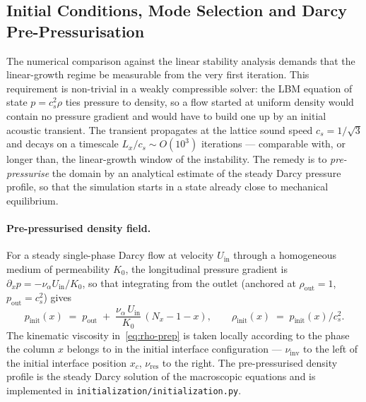 \subsection{Initial Conditions, Mode Selection and Darcy Pre-Pressurisation}
\label{sec:initial-conditions}

The numerical comparison against the linear stability analysis demands that the linear-growth regime be measurable from the very first iteration.
This requirement is non-trivial in a weakly compressible solver: the LBM equation of state $p = c_s^{2}\rho$ ties pressure to density, so a flow started at uniform density would contain no pressure gradient and would have to build one up by an initial acoustic transient.
The transient propagates at the lattice sound speed $c_s = 1/\sqrt{3}$ and decays on a timescale $L_x/c_s \sim O(10^{3})$ iterations --- comparable with, or longer than, the linear-growth window of the instability.
The remedy is to \emph{pre-pressurise} the domain by an analytical estimate of the steady Darcy pressure profile, so that the simulation starts in a state already close to mechanical equilibrium.

\paragraph{Pre-pressurised density field.}
For a steady single-phase Darcy flow at velocity $U_{\mathrm{in}}$ through a homogeneous medium of permeability $K_0$, the longitudinal pressure gradient is $\partial_x p = -\nu_\alpha U_{\mathrm{in}}/K_0$, so that integrating from the outlet (anchored at $\rho_{\mathrm{out}} = 1$, $p_{\mathrm{out}} = c_s^{2}$) gives
\begin{equation}
p_{\mathrm{init}}(x)
\;=\; p_{\mathrm{out}} \;+\; \frac{\nu_\alpha\,U_{\mathrm{in}}}{K_0}\,(N_x - 1 - x),
\qquad
\rho_{\mathrm{init}}(x) \;=\; p_{\mathrm{init}}(x)/c_s^{2}.
\label{eq:rho-prep}
\end{equation}
The kinematic viscosity in~\eqref{eq:rho-prep} is taken locally according to the phase the column $x$ belongs to in the initial interface configuration --- $\nu_{\mathrm{inv}}$ to the left of the initial interface position $x_c$, $\nu_{\mathrm{res}}$ to the right.
The pre-pressurised density profile is the steady Darcy solution of the macroscopic equations and is implemented in \texttt{initialization/initialization.py}.

